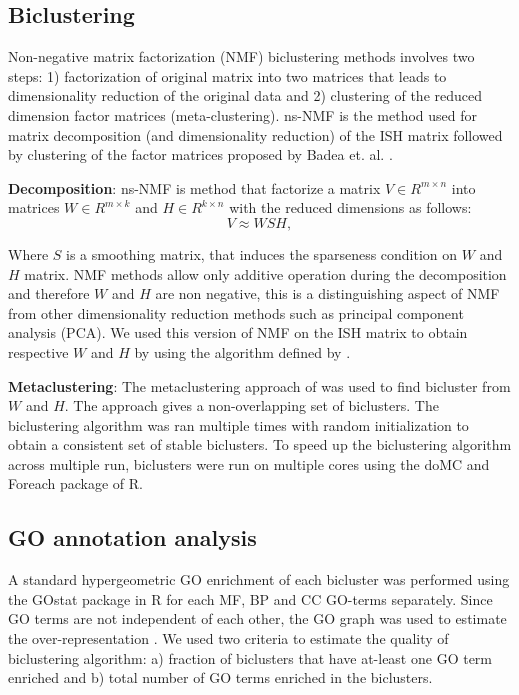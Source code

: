 \documentclass{article}
\begin{document}
\subsection{Biclustering}
Non-negative matrix factorization (NMF) biclustering methods involves two steps: 1) factorization of original matrix into two
matrices that leads to dimensionality
reduction of the original data and 2) clustering of the reduced dimension factor matrices (meta-clustering). 
ns-NMF is the method used for matrix decomposition (and dimensionality reduction)
of the ISH matrix followed by clustering of the factor matrices proposed by Badea et. al. \cite{badea2007stable}.

\textbf{Decomposition}: ns-NMF is method that factorize a matrix $V \in R^{m\times n}$ into matrices
$W\in R^{m\times k}$ and $H \in R^{k \times n}$ with the reduced dimensions as follows:
\begin{equation}
    V \approx WSH,
\end{equation}

Where $S$ is a smoothing matrix, that induces the sparseness condition on $W$ and $H$ matrix.
NMF methods allow only additive operation during the decomposition and therefore $W$ and $H$ are non negative,
this is a distinguishing aspect of NMF from other dimensionality reduction methods such as
principal component analysis (PCA). We used this version of NMF on the ISH matrix
to obtain respective $W$ and $H$ by using the algorithm defined by \cite{carmona2006biclustering}.  

\textbf{Metaclustering}: The metaclustering approach of \cite{badea2007stable} was used to 
find bicluster from $W$ and $H$.
The approach gives a non-overlapping set of biclusters. The biclustering algorithm was ran multiple times with random
initialization to obtain a consistent
set of stable biclusters. To speed up the biclustering algorithm across multiple run, biclusters were run on multiple 
cores using the doMC and Foreach package of R. 


\subsection{GO annotation analysis}
A standard hypergeometric GO enrichment of each bicluster was performed using the GOstat package in R for each  MF,
BP and CC GO-terms separately. 
Since GO terms are not independent of each other, the 
GO graph was used to estimate the over-representation \cite{alexa2006improved}. We used two
criteria to estimate the quality of biclustering algorithm: a) fraction of biclusters that have at-least one 
GO term enriched and b) total number of GO terms enriched in the biclusters.
\end{document}
